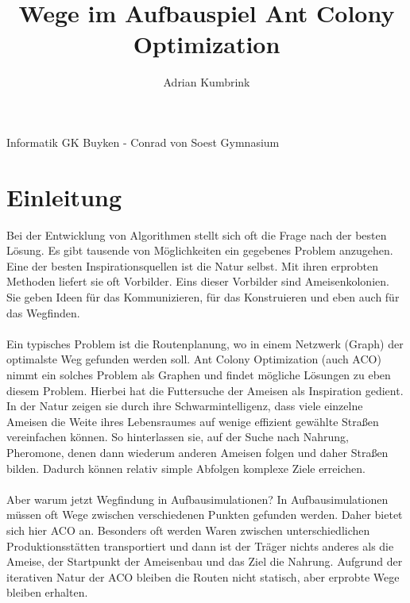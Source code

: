 \documentclass[12pt]{article}
\title{Wege im Aufbauspiel \linebreak Ant Colony Optimization}
\author{Adrian Kumbrink}
\begin{document}
\begin{titlepage}


\maketitle
\thispagestyle{empty}

\vspace*{\fill}
\begin{center}
Informatik GK Buyken - Conrad von Soest Gymnasium
\end{center}

\end{titlepage}



\thispagestyle{empty}
\tableofcontents
\pagebreak


\section{Einleitung} \label{Einleitung}
Bei der Entwicklung von Algorithmen stellt sich oft die Frage nach der besten Lösung. Es gibt tausende von Möglichkeiten ein gegebenes Problem anzugehen. Eine der besten Inspirationsquellen ist die Natur selbst. Mit ihren erprobten Methoden liefert sie oft Vorbilder. Eins dieser Vorbilder sind Ameisenkolonien. Sie geben Ideen für das Kommunizieren, für das Konstruieren und eben auch für das Wegfinden.\\\\
Ein typisches Problem ist die Routenplanung, wo in einem Netzwerk (Graph) der optimalste Weg gefunden werden soll. Ant Colony Optimization (auch ACO) nimmt ein solches Problem als Graphen und findet mögliche Lösungen zu eben diesem Problem. Hierbei hat die Futtersuche der Ameisen als Inspiration gedient. In der Natur zeigen sie durch ihre Schwarmintelligenz, dass viele einzelne Ameisen die Weite ihres Lebensraumes auf wenige effizient gewählte Straßen vereinfachen können. So hinterlassen sie, auf der Suche nach Nahrung, Pheromone, denen dann wiederum anderen Ameisen folgen und daher Straßen bilden. Dadurch können relativ simple Abfolgen komplexe Ziele erreichen.\\\\
Aber warum jetzt Wegfindung in Aufbausimulationen? In Aufbausimulationen müssen oft Wege zwischen verschiedenen Punkten gefunden werden. Daher bietet sich hier ACO an. Besonders oft werden Waren zwischen unterschiedlichen Produktionsstätten transportiert und dann ist der Träger nichts anderes als die Ameise, der Startpunkt der Ameisenbau und das Ziel die Nahrung. Aufgrund der iterativen Natur der ACO bleiben die Routen nicht statisch, aber erprobte Wege bleiben erhalten.
\end{document}
